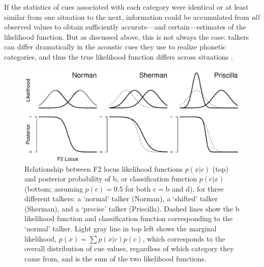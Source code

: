 If the statistics of cues associated with each category were identical or at least similar from one situation to the next, information could be accumulated from \emph{all} observed values to obtain sufficiently accurate---and certain---estimates of the likelihood function.
But as discussed above, this is not always the case: talkers can differ dramatically in the acoustic cues they use to realize phonetic categories, and thus the true likelihood function differs across situations \cite{Allen2003,Labov1972,Hillenbrand1995,McMurray2011a,Pierrehumbert2003}.

\begin{figure}[t]
  \centering
  \includegraphics[width=\textwidth]{figs/dist-id-shift-var-schematic.pdf}
  \caption{Relationship between F2 locus likelihood functions $p(x | c)$ (top) and posterior probability of \ph b, or classification function $p(c | x)$ (bottom; assuming $p(c)=0.5$ for both $c=$\ph b and \ph d), for three different talkers: a `normal' talker (Norman), a `shifted' talker (Sherman), and a `precise' talker (Priscilla).  Dashed lines show the \ph b likelihood function and classification function corresponding to the `normal' talker.  Light gray line in top left shows the marginal likelihood, $p(x) = \sum p(x | c) p(c)$, which corresponds to the overall distribution of cue values, regardless of which category they came from, and is the sum of the two likelihood functions.}
  \label{fig:dist-id-schematic}
\end{figure}

